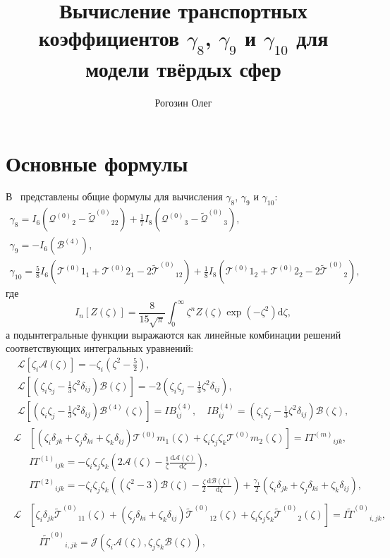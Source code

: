 \documentclass[a4paper,12pt]{article}
\title{Вычисление транспортных коэффициентов \(\gamma_8\), \(\gamma_9\) и \(\gamma_{10}\) для модели твёрдых сфер}
\author{Рогозин Олег}
\newcommand{\dd}{\mathrm{d}}
\newcommand{\der}[2][]{\frac{\dd#1}{\dd#2}}
\newcommand{\B}{\ensuremath{\mathcal{B}^{(4)}}}
\newcommand{\Q}{\ensuremath{\mathcal{Q}^{(0)}}}
\newcommand{\T}[1][0]{\ensuremath{\mathcal{T}^{(#1)}}}
\newcommand{\TT}{\ensuremath{\tilde{\mathcal{T}}^{(0)}}}
\newcommand{\QQ}{\ensuremath{\tilde{\mathcal{Q}}^{(0)}}}
\newcommand{\IF}[2][0]{\ensuremath{I{#2}^{(#1)}}}
\newcommand{\IFF}[1]{\ensuremath{I\tilde{#1}^{(0)}}}
\newcommand{\ZD}[2]{\zeta_{#1}\delta_{#2}}
\newcommand{\ZZZ}{\zeta_i\zeta_j\zeta_k}
\begin{document}
\maketitle
\tableofcontents

\section{Основные формулы}

В~\cite{Sone2000, Sone2002} представлены общие формулы для вычисления \(\gamma_8\), \(\gamma_9\) и \(\gamma_{10}\):
\begin{gather}
    \gamma_8 = I_6\left(\Q_2 - \QQ_{22}\right) + \frac17 I_8\left(\Q_3 - \QQ_3\right), \label{eq:gamma_8}\\
    \gamma_9 = -I_6\left(\B\right), \label{eq:gamma_9}\\
    \gamma_{10} = \frac58 I_6\left(\T{1}_1 + \T{2}_1 - 2\TT_{12}\right)
        + \frac18 I_8\left(\T{1}_2 + \T{2}_2 - 2\TT_2\right), \label{eq:gamma_10}
\end{gather}
где
\begin{equation}\label{eq:I_n}
    I_n[Z(\zeta)] = \frac{8}{15\sqrt\pi} \int_0^\infty \zeta^n Z(\zeta) \exp(-\zeta^2) \dd\zeta,
\end{equation}
а подынтегральные функции выражаются как линейные комбинации решений соответствующих интегральных уравнений:
\begin{gather}
    \mathcal{L}\left[\zeta_i\mathcal{A}(\zeta)\right] = -\zeta_i\left(\zeta^2-\frac52\right), \label{eq:A}\\[6pt]
    \mathcal{L}\left[\left(\zeta_i\zeta_j-\frac13\zeta^2\delta_{ij}\right)\mathcal{B}(\zeta)\right] =
        -2\left(\zeta_i\zeta_j-\frac13\zeta^2\delta_{ij}\right), \label{eq:B}\\[6pt]
    \mathcal{L}\left[\left(\zeta_i\zeta_j-\frac13\zeta^2\delta_{ij}\right)\B(\zeta)\right] = IB^{(4)}_{ij}, \quad
        IB^{(4)}_{ij} = \left(\zeta_i\zeta_j-\frac13\zeta^2\delta_{ij}\right)\mathcal{B}(\zeta), \label{eq:B_4}
\end{gather}
\begin{gather}
    \begin{aligned}
    \mathcal{L}&\left[(\ZD{i}{jk}+\ZD{j}{ki}+\ZD{k}{ij})\T{m}_1(\zeta) + \ZZZ\T{m}_2(\zeta)\right] = \IF[m]{T}_{ijk}, \\
        & \IF[1]{T}_{ijk} = -\ZZZ\left( 2\mathcal{A}(\zeta) - \frac1\zeta \der[\mathcal{A}(\zeta)]{\zeta} \right), \\
        & \IF[2]{T}_{ijk} = -\ZZZ\left( (\zeta^2-3)\mathcal{B}(\zeta) - \frac\zeta2 \der[\mathcal{B}(\zeta)]{\zeta} \right)
        + \frac{\gamma_1}{2} (\ZD{i}{jk}+\ZD{j}{ki}+\ZD{k}{ij}),
    \end{aligned}\label{eq:T}\\
    \begin{aligned}
    \mathcal{L}&\left[\ZD{i}{jk}\TT_{11}(\zeta)+(\ZD{j}{ki}+\ZD{k}{ij})\TT_{12}(\zeta) + \ZZZ\TT_2(\zeta)\right]
        = \IFF{T}_{i,jk}, \\
        &\quad \IFF{T}_{i,jk} = \mathcal{J}(\zeta_i\mathcal{A}(\zeta), \zeta_j\zeta_k\mathcal{B}(\zeta)),
    \end{aligned}\label{eq:TT}
\end{gather}
\end{document}
